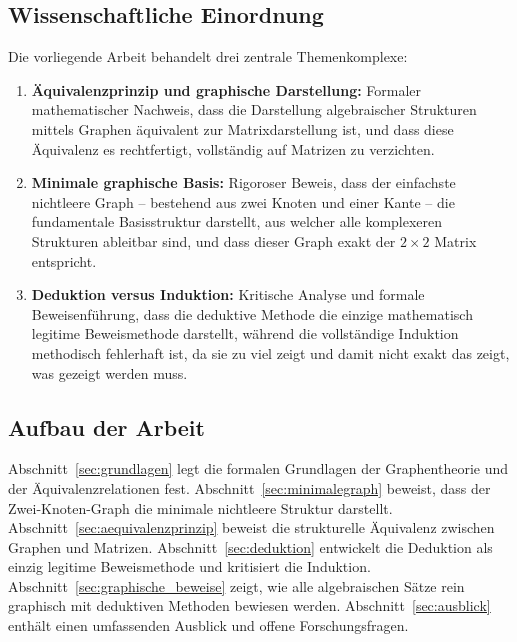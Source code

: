 \documentclass[12pt, a4paper]{article}
\theoremstyle{definition}
\theoremstyle{remark}
\begin{document}
\subsection{Wissenschaftliche Einordnung}
\label{subsec:einordnung}

Die vorliegende Arbeit behandelt drei zentrale Themenkomplexe:

\begin{enumerate}[label=(\roman*)]
  \item \textbf{Äquivalenzprinzip und graphische Darstellung:} Formaler mathematischer Nachweis, dass die Darstellung algebraischer Strukturen mittels Graphen äquivalent zur Matrixdarstellung ist, und dass diese Äquivalenz es rechtfertigt, vollständig auf Matrizen zu verzichten.

  \item \textbf{Minimale graphische Basis:} Rigoroser Beweis, dass der einfachste nichtleere Graph -- bestehend aus zwei Knoten und einer Kante -- die fundamentale Basisstruktur darstellt, aus welcher alle komplexeren Strukturen ableitbar sind, und dass dieser Graph exakt der $2 \times 2$ Matrix entspricht.

  \item \textbf{Deduktion versus Induktion:} Kritische Analyse und formale Beweisenführung, dass die deduktive Methode die einzige mathematisch legitime Beweismethode darstellt, während die vollständige Induktion methodisch fehlerhaft ist, da sie zu viel zeigt und damit nicht exakt das zeigt, was gezeigt werden muss.
\end{enumerate}

\subsection{Aufbau der Arbeit}
\label{subsec:aufbau}

Abschnitt~\ref{sec:grundlagen} legt die formalen Grundlagen der Graphentheorie und der Äquivalenzrelationen fest. Abschnitt~\ref{sec:minimalegraph} beweist, dass der Zwei-Knoten-Graph die minimale nichtleere Struktur darstellt. Abschnitt~\ref{sec:aequivalenzprinzip} beweist die strukturelle Äquivalenz zwischen Graphen und Matrizen. Abschnitt~\ref{sec:deduktion} entwickelt die Deduktion als einzig legitime Beweismethode und kritisiert die Induktion. Abschnitt~\ref{sec:graphische_beweise} zeigt, wie alle algebraischen Sätze rein graphisch mit deduktiven Methoden bewiesen werden. Abschnitt~\ref{sec:ausblick} enthält einen umfassenden Ausblick und offene Forschungsfragen.
\end{document}

